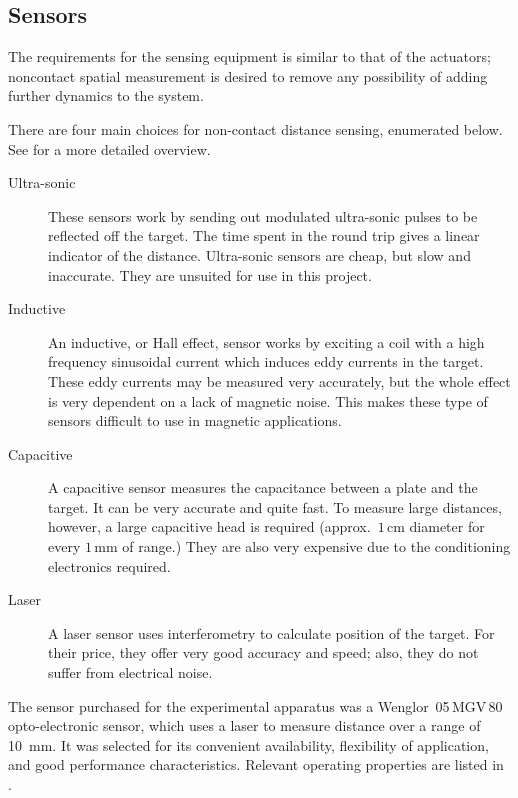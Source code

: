 \subsection{Sensors}

The requirements for the sensing equipment is similar to that
of the actuators; noncontact spatial measurement is desired
to remove any possibility of adding further dynamics to the system.

There are four main choices for non-contact distance sensing,
enumerated below. See \textcite{boehm1993} for a more detailed overview.
\begin{description}
\item[Ultra-sonic] 
    These sensors work by sending out modulated
    ultra-sonic pulses to be reflected off the target. The time spent
    in the round trip gives a linear indicator of the
    distance. Ultra-sonic sensors are cheap, but slow and
    inaccurate. They are unsuited for use in this project.
\item[Inductive] 
    An inductive, or Hall effect, sensor works by
    exciting a coil with a high frequency sinusoidal current which
    induces eddy currents in the target.  These eddy currents may be
    measured very accurately, but the whole effect is very dependent
    on a lack of magnetic noise. This makes these type of sensors
    difficult to use in magnetic applications.
\item[Capacitive] 
    A capacitive sensor measures the capacitance
    between a plate and the target.  It can be very accurate and quite
    fast. To measure large distances, however, a large capacitive head
    is required (approx.\ $1$\,cm diameter for every $1$\,mm of
    range.) They are also very expensive due to the conditioning
    electronics required.
\item[Laser] 
    A laser sensor uses interferometry to calculate position
    of the target. For their price, they offer very good accuracy and
    speed; also, they do not suffer from electrical noise.
\end{description}

The sensor purchased for the experimental apparatus was a Wenglor~05\,MGV\,80
opto-electronic sensor, which uses a laser to measure distance over a
range of \SI{10}{mm}. It was selected for its convenient availability,
flexibility of application, and good performance characteristics.
Relevant operating properties are listed in .

